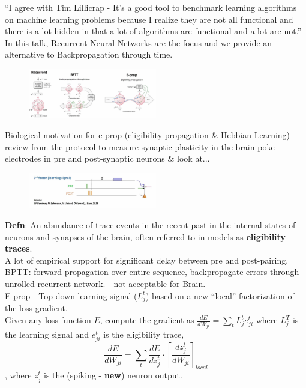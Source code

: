 \documentclass[12pt]{article}
\begin{document}
``I agree with Tim Lillicrap - It's a good tool to benchmark learning algorithms on machine learning problems because I realize they are not all functional and there is a lot hidden in that a lot of algorithms are functional and a lot are not.'' In this talk, Recurrent Neural Networks are the focus and we provide an alternative to Backpropagation through time. \\
\begin{figure}
  \centering
      \includegraphics[width=0.5\textwidth]{images/eprop.png}
  \caption{}
\end{figure}

Biological motivation for e-prop (eligibility propagation \& Hebbian Learning) review from \cite{Gerstner18} the protocol to measure synaptic plasticity in the brain poke electrodes in pre and post-synaptic neurons \& look at... \\
\begin{figure}
  \centering
      \includegraphics[width=0.5\textwidth]{images/3fl.png}
  \caption{}
\end{figure}

\textbf{Defn}: An abundance of trace events in the recent past in the internal states of neurons and synapses of the brain, often referred to in models as \textbf{eligibility traces}. \\

A lot of empirical support for significant delay between pre and post-pairing. \\

BPTT: forward propagation over entire sequence, backpropagate errors through unrolled recurrent network. - not acceptable for Brain. \\

E-prop - Top-down learning signal ($L_j^t$) based on a new ``local'' factorization of the loss gradient. \\

Given any loss function $E$, compute the gradient as $\frac{dE}{dW_{ji}} = \sum_t L_j^te_{ji}^t$ where $L_j^T$ is the learning signal and $e^t_{ji}$ is the eligibility trace, 
$$\frac{dE}{dW_{ji}} = \sum_t \frac{dE}{dz_j^t}\cdot[\frac{dz_j^t}{dW_{ji}}]_{local}$$,
where $z_j^t$ is the (spiking - \textbf{new}) neuron output.
\end{document}
